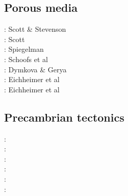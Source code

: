 \subsection{Porous media} 

\begin{scriptsize}
\nineteeneightysix: Scott \& Stevenson \cite{scst86}\\
\nineteeneightyeight: Scott \cite{scot88}\\
\nineteenninetythree: Spiegelman \cite{spie93}\\
\twothousand: Schoofs et al \cite{scth00b}\\
\twothousandthirteen: Dymkova \& Gerya \cite{dyge13}\\
\twothousandnineteen: Eichheimer et al \cite{eitp19}\\
\twothousandtwenty: Eichheimer et al \cite{eitf20}
\end{scriptsize}

\subsection{Precambrian tectonics}

\begin{scriptsize}
\nineteenninetyfour: \cite{guto94}\\
\twothousandthree: \cite{wemv03}\\
\twothousandten: \cite{sigb10}\\
\twothousandeleven: \cite{pege11}\\
\twothousandfourteen: \cite{gery14}\cite{gagb14}\cite{sigb14}\\
\twothousandtwenty: \cite{poyd20}
\end{scriptsize}

